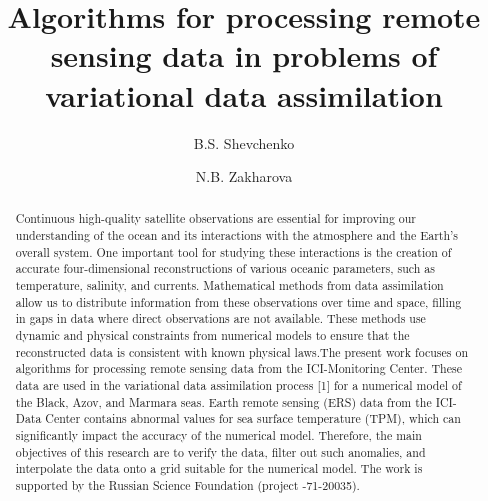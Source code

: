 \begin{englishtitle} %
\title{Algorithms for processing remote sensing data in problems of variational data assimilation}
\author{B.S. Shevchenko  \and  N.B. Zakharova
}

\maketitle

\begin{abstract}
Continuous high-quality satellite observations are essential for improving our understanding of the ocean and its interactions with the atmosphere and the Earth's overall system. One important tool for studying these interactions is the creation of accurate four-dimensional reconstructions of various oceanic parameters, such as temperature, salinity, and currents. Mathematical methods from data assimilation allow us to distribute information from these observations over time and space, filling in gaps in data where direct observations are not available. These methods use dynamic and physical constraints from numerical models to ensure that the reconstructed data is consistent with known physical laws.The present work focuses on algorithms for processing remote sensing data from the ICI-Monitoring Center. These data are used in the variational data assimilation process [1] for a numerical model of the Black, Azov, and Marmara seas. Earth remote sensing (ERS) data from the ICI-Data Center contains abnormal values for sea surface temperature (TPM), which can significantly impact the accuracy of the numerical model. Therefore, the main objectives of this research are to verify the data, filter out such anomalies, and interpolate the data onto a grid suitable for the numerical model.
The work is supported by the Russian Science Foundation (project -71-20035).

\end{abstract}
\end{englishtitle}

\iffalse
%
%


